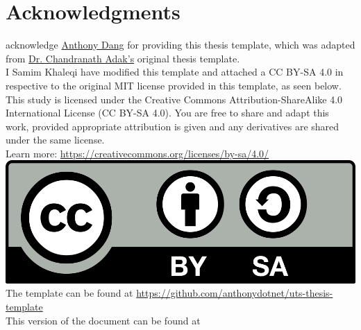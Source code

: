 \chapter*{Acknowledgments}
{} 

\begin{SingleSpace}
     acknowledge \href{https://www.linkedin.com/in/anthonydotnet/}{Anthony Dang} for providing this thesis template, which was adapted from \href{https://sites.google.com/site/chandranathadak1989}{Dr. Chandranath Adak's} original thesis template. \\
    I Samim Khaleqi have modified this template and attached a CC BY-SA 4.0 in respective to the original MIT license provided in this template, as seen below. \\

    This study is licensed under the Creative Commons Attribution-ShareAlike 4.0 International License (CC BY-SA 4.0).
You are free to share and adapt this work, provided appropriate attribution is given and any derivatives are shared under the same license.   \\
Learn more: \href{https://creativecommons.org/licenses/by-sa/4.0/]}{https://creativecommons.org/licenses/by-sa/4.0/} \\
\includegraphics[scale=0.08]{assets/footer.png} \\

The template can be found at \href{https://github.com/anthonydotnet/uts-thesis-template}{https://github.com/anthonydotnet/uts-thesis-template} \\

This version of the document can be found at \href{}{}
\end{SingleSpace}
\clearpage

